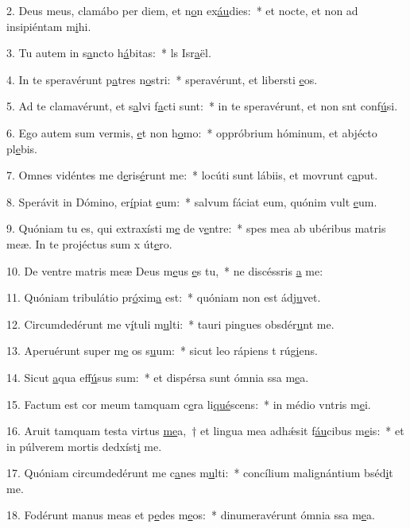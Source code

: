 2. Deus meus, clamábo per diem, et n\uline{o}n ex\uline{áu}dies:~* et nocte, et non ad insipiéntam m\uline{i}hi.\par 
3. Tu autem in s\uline{a}ncto h\uline{á}bitas:~* ls Isr\uline{a}ël.\par 
4. In te speravérunt p\uline{a}tres n\uline{o}stri:~* speravérunt, et libersti \uline{e}os.\par 
5. Ad te clamavérunt, et s\uline{a}lvi f\uline{a}cti sunt:~* in te speravérunt, et non snt conf\uline{ú}si.\par 
6. Ego autem sum vermis, \uline{e}t non h\uline{o}mo:~* oppróbrium hóminum, et abjécto pl\uline{e}bis.\par 
7. Omnes vidéntes me d\uline{e}ris\uline{é}runt me:~* locúti sunt lábiis, et movrunt c\uline{a}put.\par 
8. Sperávit in Dómino, er\uline{í}piat \uline{e}um:~* salvum fáciat eum, quónim vult \uline{e}um.\par 
9. Quóniam tu es, qui extraxísti m\uline{e} de v\uline{e}ntre:~* spes mea ab ubéribus matris meæ. In te projéctus sum x út\uline{e}ro.\par 
10. De ventre matris meæ Deus m\uline{e}us \uline{e}s tu,~* ne discéssris \uline{a} me:\par 
11. Quóniam tribulátio pr\uline{ó}xim\uline{a} est:~* quóniam non est  ádj\uline{u}vet.\par 
12. Circumdedérunt me v\uline{í}tuli m\uline{u}lti:~* tauri pingues obsdér\uline{u}nt me.\par 
13. Aperuérunt super m\uline{e} os s\uline{u}um:~* sicut leo rápiens t rúg\uline{i}ens.\par 
14. Sicut \uline{a}qua eff\uline{ú}sus sum:~* et dispérsa sunt ómnia ssa m\uline{e}a.\par 
15. Factum est cor meum tamquam c\uline{e}ra li\uline{qué}scens:~* in médio vntris m\uline{e}i.\par 
16. Aruit tamquam testa virtus \uline{me}a,~† et lingua mea adhǽsit f\uline{áu}cibus m\uline{e}is:~* et in púlverem mortis dedxíst\uline{i} me.\par 
17. Quóniam circumdedérunt me c\uline{a}nes m\uline{u}lti:~* concílium malignántium bséd\uline{i}t me.\par 
18. Fodérunt manus meas et p\uline{e}des m\uline{e}os:~* dinumeravérunt ómnia ssa m\uline{e}a.\par 
